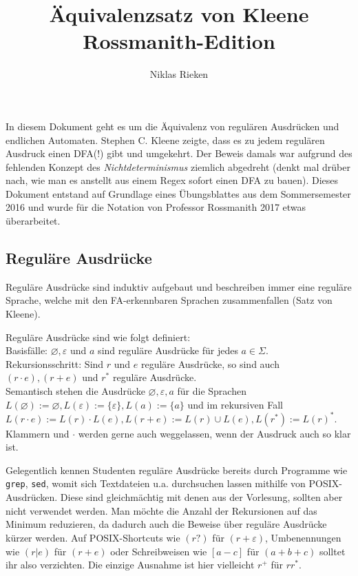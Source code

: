 \documentclass[11pt, a4paper]{article}
\author{Niklas Rieken}
\title{Äquivalenzsatz von Kleene\\Rossmanith-Edition}
\let\emptyset\varnothing
\begin{document}
\maketitle

In diesem Dokument geht es um die Äquivalenz von regulären Ausdrücken und endlichen Automaten. Stephen C. Kleene zeigte, dass es zu jedem regulären Ausdruck einen DFA(!) gibt und umgekehrt. Der Beweis damals war aufgrund des fehlenden Konzept des \textit{Nichtdeterminismus} ziemlich abgedreht (denkt mal drüber nach, wie man es anstellt aus einem Regex sofort einen DFA zu bauen). Dieses Dokument entstand auf Grundlage eines Übungsblattes aus dem Sommersemester 2016 und wurde für die Notation von Professor Rossmanith 2017 etwas überarbeitet.

\subsection*{Reguläre Ausdrücke}
Reguläre Ausdrücke sind induktiv aufgebaut und beschreiben immer eine reguläre Sprache, welche mit den FA-erkennbaren Sprachen zusammenfallen (Satz von Kleene).\par
Reguläre Ausdrücke sind wie folgt definiert:\\
Basisfälle: \( \emptyset, \varepsilon \) und \( a \) sind reguläre Ausdrücke für jedes \( a \in \Sigma \).\\
Rekursionsschritt: Sind \( r \) und \( e \) reguläre Ausdrücke, so sind auch \( (r \cdot e), (r + e) \) und \( r^\ast \) reguläre Ausdrücke.\\
Semantisch stehen die Ausdrücke \( \emptyset, \varepsilon, a \) für die Sprachen \( L(\emptyset) := \emptyset, L(\varepsilon) := \{ \varepsilon \}, L(a) := \{ a \} \) und im rekursiven Fall \( L(r \cdot e) := L(r) \cdot L(e), L(r + e) := L(r) \cup L(e), L(r^\ast) := L(r)^\ast \). Klammern und \( \cdot \) werden gerne auch weggelassen, wenn der Ausdruck auch so klar ist.\par
Gelegentlich kennen Studenten reguläre Ausdrücke bereits durch Programme wie \texttt{grep}, \texttt{sed}, womit sich Textdateien u.a. durchsuchen lassen mithilfe von POSIX-Ausdrücken. Diese sind gleichmächtig mit denen aus der Vorlesung, sollten aber nicht verwendet werden. Man möchte die Anzahl der Rekursionen auf das Minimum reduzieren, da dadurch auch die Beweise über reguläre Ausdrücke kürzer werden. Auf POSIX-Shortcuts wie \( (r?) \) für \( (r + \varepsilon) \), Umbenennungen wie \( (r|e) \) für \( (r + e) \) oder Schreibweisen wie \( [a-c] \) für \( (a + b + c) \) solltet ihr also verzichten. Die einzige Ausnahme ist hier vielleicht \( r^+ \) für \( rr^\ast \).\par
\end{document}
